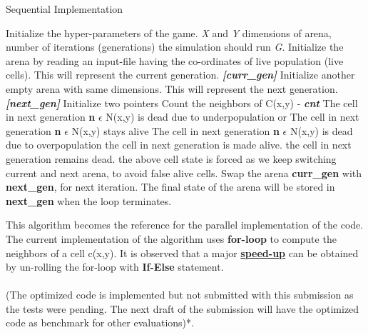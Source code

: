 \documentclass[a4paper, 10pt, conference]{IEEEtran}      %
\begin{document}
	\begin{algorithm}
		\caption{Sequential Implementation}
		\label{sequential}
		\begin{algorithmic}[1]
			\State Initialize the hyper-parameters of the game. \textit{X} and \textit{Y} dimensions of arena, number of iterations (generations) the simulation should run \textit{G}.
			\State Initialize the arena by reading an input-file having the co-ordinates of live population (live cells). This will represent the current generation. \textbf{\textit{[curr\_gen]}}
			\State Initialize another empty arena with same dimensions. This will represent the next generation.
			\textbf{\textit{[next\_gen]}}
			\State Initialize two pointers 
					\State Count the neighbors of C(x,y) - \textbf{\textit{cnt}}
							\State The cell in next generation \textbf{n} $\epsilon$ N(x,y) is
							\State dead due to underpopulation or
						\State The cell in next generation \textbf{n} $\epsilon$ N(x,y)
						\State stays alive
						\State The cell in next generation \textbf{n} $\epsilon$ N(x,y) is
						\State dead due to overpopulation
						\EndIf
							\State the cell in next generation is made alive.
						\Else
							\State the cell in next generation remains dead.
							\State the above cell state is forced as we keep 
							\State switching current and next arena, to avoid
							\State false alive cells.
						\EndIf					
					\EndIf
					\State Swap the arena \textbf{curr\_gen} with \textbf{next\_gen}, for next \State iteration.
				\EndFor
			\EndFor
			\State The final state of the arena will be stored in \textbf{next\_gen} when the loop terminates.
		\end{algorithmic}
	\end{algorithm}
	
	This algorithm becomes the reference for the parallel implementation of the code. The current implementation of the algorithm uses \textbf{for-loop} to compute the neighbors of a cell c(x,y). It is observed that a major \underline{\textbf{speed-up}} can be obtained by un-rolling the for-loop with \textbf{If-Else} statement. \\\\
	(The optimized code is implemented but not submitted with this submission as the tests were pending. The next draft of the submission will have the optimized code as benchmark for other evaluations)*.
	
\end{document}
